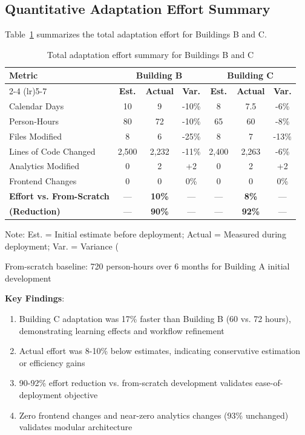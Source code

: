 \documentclass[acmlarge]{acmart}
\begin{document}
\subsection{Quantitative Adaptation Effort Summary}

Table~\ref{tab:adaptation-effort-summary} summarizes the total adaptation effort for Buildings B and C.

\begin{table}[h]
\centering
\begin{threeparttable}
\caption{Total adaptation effort summary for Buildings B and C}
\label{tab:adaptation-effort-summary}
\small
\begin{tabular}{@{}lcccccc@{}}
\toprule
\multirow{2}{*}{\textbf{Metric}} & \multicolumn{3}{c}{\textbf{Building B}} & \multicolumn{3}{c}{\textbf{Building C}} \\
\cmidrule(lr){2-4} \cmidrule(lr){5-7}
 & \textbf{Est.} & \textbf{Actual} & \textbf{Var.} & \textbf{Est.} & \textbf{Actual} & \textbf{Var.} \\
\midrule
Calendar Days & 10 & 9 & -10\% & 8 & 7.5 & -6\% \\
Person-Hours & 80 & 72 & -10\% & 65 & 60 & -8\% \\
Files Modified & 8 & 6 & -25\% & 8 & 7 & -13\% \\
Lines of Code Changed & 2,500 & 2,232 & -11\% & 2,400 & 2,263 & -6\% \\
Analytics Modified & 0 & 2 & +2 & 0 & 2 & +2 \\
Frontend Changes & 0 & 0 & 0\% & 0 & 0 & 0\% \\
\midrule
\textbf{Effort vs. From-Scratch} & — & \textbf{10\%} & — & — & \textbf{8\%} & — \\
\textbf{(Reduction)} & — & \textbf{90\%} & — & — & \textbf{92\%} & — \\
\bottomrule
\end{tabular}
\begin{tablenotes}
\small
\item Note: Est. = Initial estimate before deployment; Actual = Measured during deployment; Var. = Variance (%
\item From-scratch baseline: 720 person-hours over 6 months for Building A initial development
\end{tablenotes}
\end{threeparttable}
\end{table}

\textbf{Key Findings}:
\begin{enumerate}
    \item Building C adaptation was 17\% faster than Building B (60 vs. 72 hours), demonstrating learning effects and workflow refinement
    \item Actual effort was 8-10\% below estimates, indicating conservative estimation or efficiency gains
    \item 90-92\% effort reduction vs. from-scratch development validates ease-of-deployment objective
    \item Zero frontend changes and near-zero analytics changes (93\% unchanged) validates modular architecture
\end{enumerate}
\end{document}
